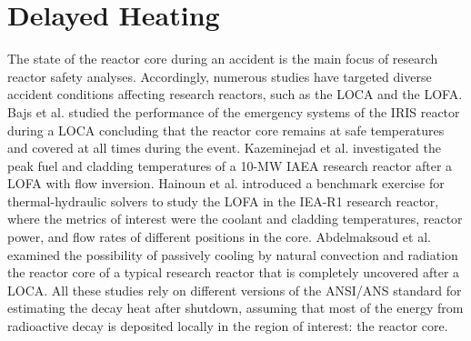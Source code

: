 \label{ch:lit}

\section{Delayed Heating}


The state of the reactor core during an accident is the main focus of research reactor safety analyses.
Accordingly, numerous studies have targeted diverse accident conditions affecting research reactors, such as the \gls*{LOCA} and the \gls*{LOFA}.
Bajs et al. \cite{bajs_loca_2003} studied the performance of the emergency systems of the \gls* {IRIS} reactor during a LOCA concluding that the reactor core remains at safe temperatures and covered at all times during the event.
Kazeminejad et al. \cite{kazeminejad_thermal_2008} investigated the peak fuel and cladding temperatures of a 10-MW \gls*{IAEA} research reactor after a LOFA with flow inversion.
Hainoun et al. \cite{hainoun_international_2014} introduced a benchmark exercise for thermal-hydraulic solvers to study the LOFA in the IEA-R1 research reactor, where the metrics of interest were the coolant and cladding temperatures, reactor power, and flow rates of different positions in the core.
Abdelmaksoud et al. \cite{abdelmaksoud_analysis_2022} examined the possibility of passively cooling by natural convection and radiation the reactor core of a typical research reactor that is completely uncovered after a LOCA.
All these studies rely on different versions of the ANSI/ANS standard \cite{ans_decay_1994} for estimating the decay heat after shutdown, assuming that most of the energy from radioactive decay is deposited locally in the region of interest: the reactor core.

